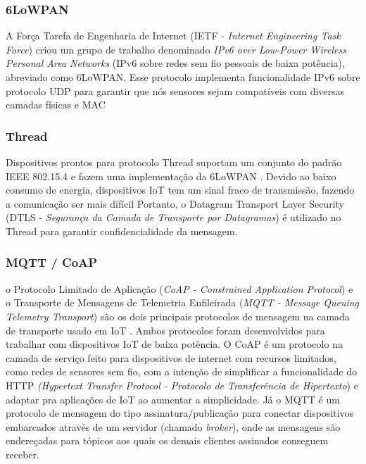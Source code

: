 \documentclass[tcc,capa]{texufpel}
\begin{document}
\subsubsection{6LoWPAN}

A Força Tarefa de Engenharia de Internet (IETF - \textit{Internet Engineering Task Force}) criou um grupo de trabalho denominado \textit{IPv6 over Low-Power Wireless Personal Area Networks} (IPv6 sobre redes sem fio pessoais de baixa potência), abreviado como 6LoWPAN. Esse protocolo implementa funcionalidade IPv6 sobre protocolo UDP para garantir que nós sensores sejam compatíveis com diversas camadas físicas e MAC \cite{schiller}

\subsubsection{Thread}
Dispositivos prontos para protocolo Thread suportam um conjunto do padrão IEEE 802.15.4 e fazem uma implementação da 6LoWPAN \cite{schiller}. Devido ao baixo consumo de energia, dispositivos IoT tem um sinal fraco de transmissão, fazendo a comunicação ser mais difícil Portanto, o Datagram Transport Layer Security (DTLS - \textit{Segurança da Camada de Transporte por Datagramas}) é utilizado no Thread para garantir confidencialidade da mensagem.

\subsubsection{MQTT / CoAP}

o Protocolo Limitado de Aplicação (\textit{CoAP - Constrained Application Protocol})  e o Transporte de Mensagens de Telemetria Enfileirada (\textit{MQTT - Message Queuing Telemetry Transport}) são os dois principais protocolos de mensagem na camada de transporte usado em IoT \cite{schiller}. Ambos protocolos foram desenvolvidos para trabalhar com dispositivos IoT de baixa potência. O CoAP é um protocolo na camada de serviço feito para dispositivos de internet com recursos limitados, como redes de sensores sem fio, com a intenção de simplificar a funcionalidade do HTTP \textit{(Hypertext Transfer Protocol - Protocolo de Transferência de Hipertexto}) e adaptar pra aplicações de IoT ao aumentar a simplicidade. Já o MQTT é um protocolo de mensagem do tipo assinatura/publicação para conectar dispositivos embarcados através de um servidor (chamado \textit{broker}), onde as mensagens são endereçadas para tópicos aos quais os demais clientes assinados conseguem receber.
\end{document}

